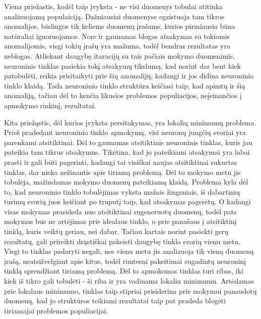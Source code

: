 \documentclass{VUMIFPSbakalaurinis}
\begin{document}
Viena priežastis, kodėl taip įvyksta - ne visi duomenys tobulai atitinka analizuojamą populaiciją.
Dažniausiai duomenyse egzistuoja tam tikros anomalijos, būdingos tik keliems duomenų įrašams, kurios pirmiausia būna natūraliai ignoruojamos.
Nors ir gaunamas blogas atsakymas su tokiomis anomalijomis, visgi tokių įrašų yra mažuma, todėl bendras rezultatas yra neblogas.
Atliekant daugybę itaracijų su tais pačiais mokymo duomenimis, neuroninis tinklas pasiekia tokį atsakymų tikslumą, kad norint dar bent kiek patobulėti, reikia prisitaikyti prie šių anomalijų, kadangi ir jos didina neuroninio tinklo klaidą.
Tada neuroninio tinklo struktūra keičiasi taip, kad apimtų ir šią anomaliją, tačiau dėl to kenčia likusios problemos populiacijos, neįeinančios į apmokymo rinkinį, rezultatai.

Kita priežąstis, dėl kurios įvyksta persitakymas, yra lokalių minimumų problema.
Prieš pradedant neuroninio tinklo apmokymą, visi neuronų jungčių svoriai yra parenkami atsitiktinai.
Dėl to gaunamas atsitiktinis neuroninis tinklas, kuris jau pateikia tam tikrus atsakymus.
Tikėtina, kad jo pateikiami atsakymai yra labai prasti ir gali būti pagerinti, kadangi tai visiškai naujas atsitiktinai sukurtas tinklas, dar nieko nežinantis apie tiriamą problemą.
Dėl to mokymo metu jis tobulėja, mažindamas mokymo duomenų pateikiamą klaidą.
Problema kyla dėl to, kad neuroninio tinklo tobulėjimas vyksta mažais žingsniais, iš dabartinių turimų svorių juos keičiant po truputį taip, kad atsakymas pagerėtų.
O kadangi visas mokymas prasideda nuo atsitiktinai sugeneruotų duomenų, todėl pats mokymas bus ne artėjimas prie idealaus tinklo, o prie panašaus į atsitiktinį tinklą, kuris veiktų geriau, nei dabar.
Tačiau kartais norint pasiekti gerų rezultatų, gali prireikti drąstiškai pakeisti daugybę tinklo svorių vienu metu.
Visgi to tinklas padaryti negali, nes vienu metu jis analizuoja tik vieną duomenų įrašą, neatsižvelgiant apie kitus, todėl rimtesni pakeitimai sugadintų neuroninį tinklą sprendžiant tiriamą problemą.
Dėl to apmokomas tinklas turi ribas, iki kiek iš tikro gali tobulėti - ši riba ir yra vadinama lokaliu minimumu.
Artėdamas prie lokalaus minimumo, tinklas taip stipriai prisiderina prie mokymui panaudotų duomenų, kad jo struktūros teikiami rezultatai taip pat pradeda blogėti tiriamajai problemos populiacijai.
\end{document}
